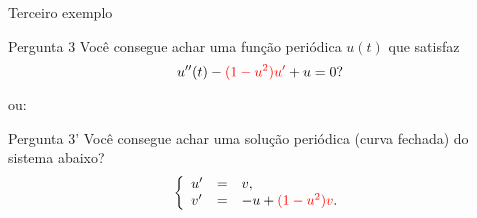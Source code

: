 \documentclass[11pt]{beamer}
\begin{document}
%
%
%
%
%



\begin{frame}[t]{Terceiro exemplo}

\begin{block}{Pergunta 3}
Você consegue achar uma função periódica $u(t)$ que satisfaz 
\[
u''(t)-\textcolor{red}{(1-u^2)u'}+u=0?
\]
\end{block}

ou:
\begin{block}{Pergunta 3'}
Você consegue achar uma solução periódica (curva fechada) do sistema abaixo?
\begin{equation}\label{5}\left\{\begin{array}{lcl}
u'&=&v,\\
v'&=&-u+\textcolor{red}{(1-u^2)v}.
\end{array}
\right.\end{equation}
\end{block}

%
%
%
%
%
%
%

\end{frame}
\end{document}

